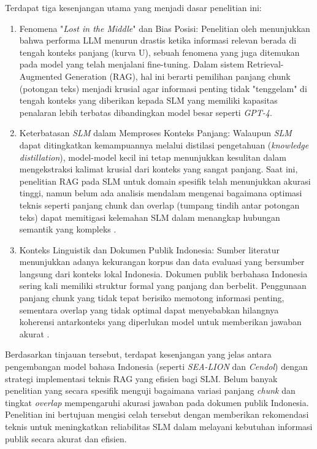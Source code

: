 Terdapat tiga kesenjangan utama yang menjadi dasar penelitian ini:
\begin{enumerate}
    \item Fenomena "\textit{Lost in the Middle}" dan Bias Posisi: Penelitian oleh \cite{Liu2023LostIT} menunjukkan bahwa performa LLM menurun drastis ketika informasi relevan berada di tengah konteks panjang (kurva U), sebuah fenomena yang juga ditemukan pada model yang telah menjalani fine-tuning. Dalam sistem Retrieval-Augmented Generation (RAG), hal ini berarti pemilihan panjang chunk (potongan teks) menjadi krusial agar informasi penting tidak "tenggelam" di tengah konteks yang diberikan kepada SLM yang memiliki kapasitas penalaran lebih terbatas dibandingkan model besar seperti \textit{GPT-4}.
    \item Keterbatasan \textit{SLM} dalam Memproses Konteks Panjang: Walaupun \textit{SLM} dapat ditingkatkan kemampuannya melalui distilasi pengetahuan (\textit{knowledge distillation}), model-model kecil ini tetap menunjukkan kesulitan dalam mengekstraksi kalimat krusial dari konteks yang sangat panjang. Saat ini, penelitian RAG pada SLM untuk domain spesifik telah menunjukkan akurasi tinggi, namun belum ada analisis mendalam mengenai bagaimana optimasi teknis seperti panjang chunk dan overlap (tumpang tindih antar potongan teks) dapat memitigasi kelemahan SLM dalam menangkap hubungan semantik yang kompleks \citep{Liu2023LostIT, lee2024logic}.
    \item Konteks Linguistik dan Dokumen Publik Indonesia: Sumber literatur menunjukkan adanya kekurangan korpus dan data evaluasi yang bersumber langsung dari konteks lokal Indonesia. Dokumen publik berbahasa Indonesia sering kali memiliki struktur formal yang panjang dan berbelit. Penggunaan panjang chunk yang tidak tepat berisiko memotong informasi penting, sementara overlap yang tidak optimal dapat menyebabkan hilangnya koherensi antarkonteks yang diperlukan model untuk memberikan jawaban akurat \citep{cahyawijaya2021indonlg}.
\end{enumerate}

Berdasarkan tinjauan tersebut, terdapat kesenjangan yang jelas antara pengembangan model bahasa Indonesia (seperti \textit{SEA-LION} dan \textit{Cendol}) dengan strategi implementasi teknis RAG yang efisien bagi SLM. Belum banyak penelitian yang secara spesifik menguji bagaimana variasi panjang \textit{chunk} dan tingkat \textit{overlap} mempengaruhi akurasi jawaban pada dokumen publik Indonesia. Penelitian ini bertujuan mengisi celah tersebut dengan memberikan rekomendasi teknis untuk meningkatkan reliabilitas SLM dalam melayani kebutuhan informasi publik secara akurat dan efisien.

